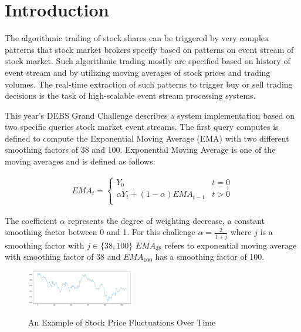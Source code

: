 
\section{Introduction}
The algorithmic trading of stock shares can be triggered by very complex patterns that stock market 
brokers specify based on patterns on event stream of stock market. Such algorithmic trading mostly are specified based on 
history of event stream and by utilizing moving averages of stock prices and trading volumes. The real-time extraction of 
such patterns to trigger buy or sell trading decisions is the task of high-scalable event stream processing systems. 

This year's DEBS Grand Challenge \cite{debs2022challenge} describes a system implementation based on two specific queries 
stock market event streams. The first query computes is defined to compute the Exponential Moving Average (EMA) with two different smoothing factors 
of 38 and 100. Exponential Moving Average is one of the moving averages and is defined as follows:

\begin{align*}
    EMA_t = \begin{cases} 
        Y_0 &  t = 0 \\ 
        \alpha Y_t + (1-\alpha) EMA_{t-1}& t>0 \\ 
        \end{cases}
\end{align*}

The coefficient $\alpha$ represents the degree of weighting decrease, a constant smoothing factor between 0 and 1.
For this challenge $\alpha = \frac{2}{1+j}$ where $j$ is a smoothing factor with $j \in \{38, 100 \}$
$EMA_{38}$ refers to exponential moving average with smoothing factor of 38 and  $EMA_{100}$ has a smoothing factor of 100. 


\begin{figure}[!ht]
    \begin{center}
        \includegraphics[width=0.42\textwidth]{./images/stock_example.png}
        \label{fig:stock}
        \caption{An Example of Stock Price Fluctuations Over Time}
    \end{center}
\end{figure}



